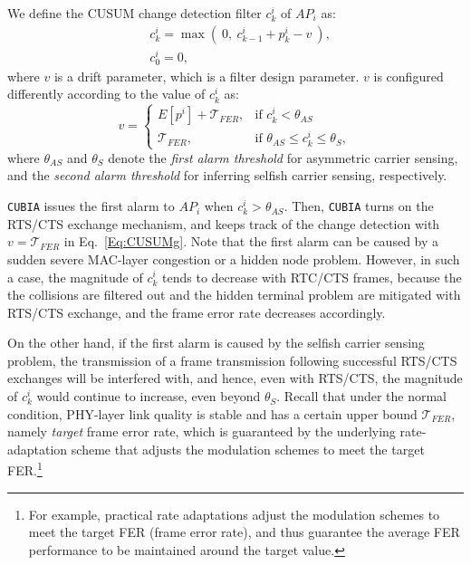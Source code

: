 We define the CUSUM change detection filter $c_k^i$ of $AP_i$ as:
\begin{eqnarray}
&c_k^i = \max(~0, ~c_{k-1}^i + p_{k}^{i} - v~),\label{Eq:CUSUMg} \\
&c_0^i = 0,\nonumber
\end{eqnarray}
where $v$ is a drift parameter, which is a filter design parameter.
$v$ is configured differently according to the value of $c_k^i$ as:
%
\begin{equation}\label{Eq:CUSUMv}
v =
\begin{cases}
E[p^{i}] + \mathcal{T}_{FER},  & \mbox{if } c_k^i < \theta_{AS} \\
\mathcal{T}_{FER}, & \mbox{if } \theta_{AS} \leq  c_k^i \leq \theta_{S},
\end{cases}
\end{equation}
%
where $\theta_{AS}$ and $\theta_{S}$ denote
the {\em first alarm threshold} for asymmetric carrier sensing, and
the {\em second alarm threshold} for inferring selfish carrier sensing,
respectively.

{\tt CUBIA} issues the first alarm to $AP_i$ when $c_k^i > \theta_{AS}$.
Then, {\tt CUBIA} turns on the RTS/CTS exchange mechanism, and
keeps track of the change detection with
$v = \mathcal{T}_{FER}$ in Eq.~\eqref{Eq:CUSUMg}.
%
Note that the first alarm can be caused by
a sudden severe MAC-layer congestion or a hidden node problem.
%
%
However, in such a case,
the magnitude of $c_k^i$ tends to decrease with RTC/CTS frames,
because the the collisions are filtered out \cite{CARA} and
the hidden terminal problem are mitigated with RTS/CTS
exchange, and the frame error rate decreases accordingly.

On the other hand, if the first alarm is caused by the selfish carrier
sensing problem, the transmission of a frame transmission following
successful RTS/CTS exchanges will be interfered with, and hence,
 even with RTS/CTS, the magnitude of $c_k^i$ would continue to
increase, even beyond $\theta_{S}$.
%
%
Recall that under the normal condition, PHY-layer link quality is stable
and has a certain upper bound $\mathcal{T}_{FER}$, namely \emph{target}
frame error rate, which is guaranteed by the underlying rate-adaptation
scheme that adjusts the modulation schemes to meet the target
FER.\footnote{For example, practical rate adaptations \cite{Jensen10}
adjust the modulation schemes to meet the target FER (frame error rate),
and thus guarantee the average FER performance to be maintained
around the target value.}

